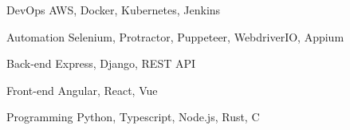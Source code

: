 

\begin{cvskills}

  \cvskill
    {DevOps} %
    {AWS, Docker, Kubernetes, Jenkins} %
    
    \cvskill
    {Automation} %
    {Selenium, Protractor, Puppeteer, WebdriverIO, Appium } %

  \cvskill
    {Back-end} %
    {Express, Django, REST API} %

  \cvskill
    {Front-end} %
    {Angular, React, Vue} %

  \cvskill
    {Programming} %
    {Python, Typescript, Node.js, Rust, C} %

\end{cvskills}
